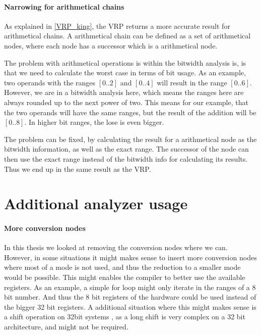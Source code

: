 \paragraph{Narrowing for arithmetical chains}
As explained in \ref{VRP_king}, the VRP returns a more accurate result for arithmetical chains. A arithmetical chain can be defined as a set of arithmetical nodes, where each node has a successor which is a arithmetical node.

The problem with arithmetical operations is within the bitwidth analysis is, is that we need to calculate the worst case in terms of bit usage. As an example, two operands with the ranges $[0..2]$ and $[0..4]$ will result in the range $[0..6]$. However, we are in a bitwidth analysis here, which means the ranges here are always rounded up to the next power of two. This means for our example, that the two operands will have the same ranges, but the result of the addition will be $[0..8]$. In higher bit ranges, the lose is even bigger.

The problem can be fixed, by calculating the result for a arithmetical node as the bitwidth information, as well as the exact range. The successor of the node can then use the exact range instead of the bitwidth info for calculating its results. Thus we end up in the same result as the VRP.

\section{Additional analyzer usage}
\paragraph{More conversion nodes}
In this thesis we looked at removing the conversion nodes where we can. However, in some situations it might makes sense to insert more conversion nodes where most of a mode is not used, and thus the reduction to a smaller mode would be possible. This might enables the compiler to better use the available registers. As an example, a simple for loop might only iterate in the ranges of a 8 bit number. And thus the 8 bit registers of the hardware could be used instead of the bigger 32 bit registers. A additional situation where this might makes sense is a shift operation on 32bit systems , as a long shift is very complex on a 32 bit architecture, and might not be required.